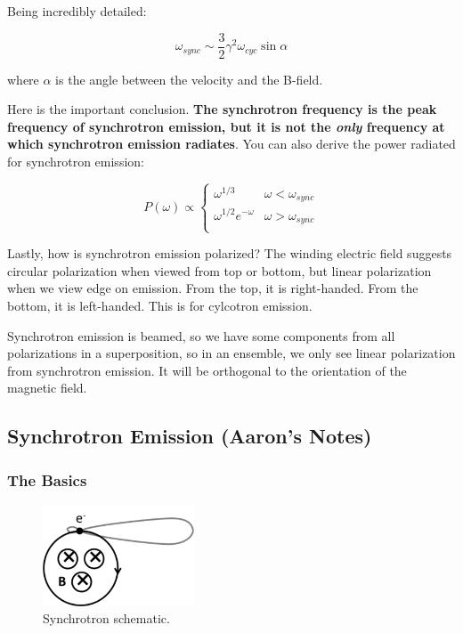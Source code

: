 \documentclass{article}
\begin{document}
Being incredibly detailed:

$$
\omega_{sync} \sim \frac32 \gamma^2 \omega_{cyc} \sin\alpha
$$

where $\alpha$ is the angle between the velocity and the B-field. 

Here is the important conclusion. \textbf{The synchrotron frequency is the peak frequency of synchrotron emission, but it is not the \textit{only} frequency at which synchrotron emission radiates}. You can also derive the power radiated for synchrotron emission:

\[ P(\omega) \propto \begin{cases} 
      \omega^{1/3} & \omega < \omega_{sync} \\
      \omega^{1/2} e^{-\omega} & \omega > \omega_{sync} \\
   \end{cases}
\]

Lastly, how is synchrotron emission polarized? The winding electric field suggests circular polarization when viewed from top or bottom, but linear polarization when we view edge on emission. From the top, it is right-handed. From the bottom, it is left-handed. This is for cylcotron emission. 

Synchrotron emission is beamed, so we have some components from all polarizations in a superposition, so in an ensemble, we only see linear polarization from synchrotron emission. It will be orthogonal to the orientation of the magnetic field. 

\subsection{Synchrotron Emission (Aaron's Notes)}

\subsubsection{The Basics}

\begin{figure}
    \centering
    \includegraphics[width=0.4\textwidth]{300px-Synchrotron.png}
    \caption{Synchrotron schematic.}
    \label{fig:synscehm}
\end{figure}
\end{document}
